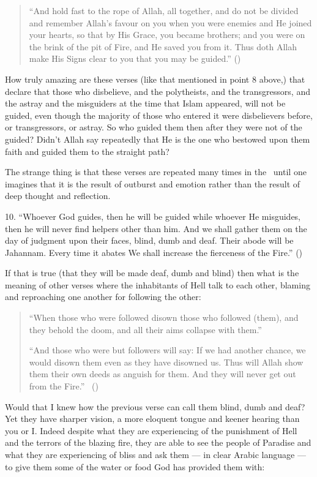 \documentclass[12pt]{memoir}
\begin{document}
\begin{quote}
“And hold fast to the rope of Allah, all together,
and do not be divided and remember Allah’s favour on you
when you were enemies and He joined your hearts,
so that by His Grace, you became brothers;
and you were on the brink of the pit of Fire, and He saved you from it.
Thus doth Allah make His Signs clear to you that you may be guided.”
()
\end{quote}

How truly amazing are these verses (like that mentioned in point 8 above,)
that declare that those who disbelieve, and the polytheists,
and the transgressors, and the astray and the misguiders at the time
that Islam appeared, will not be guided, even though the majority of those
who entered it were disbelievers before, or transgressors, or astray.
So who guided them then after they were not of the guided?
Didn’t Allah say repeatedly that He is the one who bestowed upon them faith
and guided them to the straight path?

The strange thing is that these verses are repeated many times in the \Quran\
until one imagines that it is the result of outburst and emotion rather
than the result of deep thought and reflection.

10. “Whoever God guides, then he will be guided while whoever He misguides,
then he will never find helpers other than him.
And we shall gather them on the day of judgment upon their faces,
blind, dumb and deaf.
Their abode will be Jahannam.
Every time it abates We shall increase the fierceness of the Fire.”
(\QRef{17:97})

If that is true (that they will be made deaf, dumb and blind)
then what is the meaning of other verses
where the inhabitants of Hell talk to each other,
blaming and reproaching one another for following the other:

\begin{quote}
“When those who were followed disown those who followed (them),
and they behold the doom, and all their aims collapse with them.”

“And those who were but followers will say: If we had another chance,
we would disown them even as they have disowned us.
Thus will Allah show them their own deeds as anguish for them.
And they will never get out from the Fire.”%
\fnmarksym[*]\ ()
\end{quote}

Would that I knew how the previous verse can call them blind, dumb and deaf?
Yet they have sharper vision, a more eloquent tongue
and keener hearing than you or I.
Indeed despite what they are experiencing of the punishment of Hell
and the terrors of the blazing fire,
they are able to see the people of Paradise
and what they are experiencing of bliss and ask them —
in clear Arabic language — to give them some of the water
or food God has provided them with:
\end{document}
